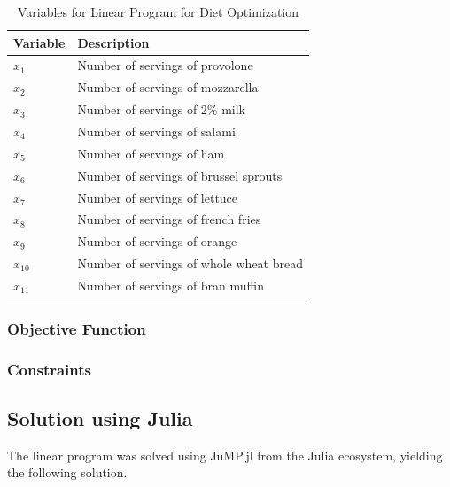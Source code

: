 \documentclass{article}
\begin{document}
    \begin{table}[H]
        \centering
        \begin{tabular}{@{}ll@{}}
        \toprule
        Variable & Description                             \\ \midrule
        $x_1$         & Number of servings of provolone         \\
        $x_2$         & Number of servings of mozzarella        \\
        $x_3$         & Number of servings of 2\% milk          \\
        $x_4$         & Number of servings of salami            \\
        $x_5$         & Number of servings of ham               \\
        $x_6$         & Number of servings of brussel sprouts   \\
        $x_7$         & Number of servings of lettuce           \\
        $x_8$         & Number of servings of french fries      \\
        $x_9$         & Number of servings of orange            \\
        $x_{10}$      & Number of servings of whole wheat bread \\
        $x_{11}$      & Number of servings of bran muffin       \\ \bottomrule
        \end{tabular}
        \caption{Variables for Linear Program for Diet Optimization}
        \label{tab:Q1_variables}
    \end{table}

    \subsubsection{Objective Function}

    \subsubsection{Constraints}

    \subsection{Solution using Julia}

    The linear program was solved using JuMP.jl from the Julia ecosystem, yielding the following solution.

\end{document}
